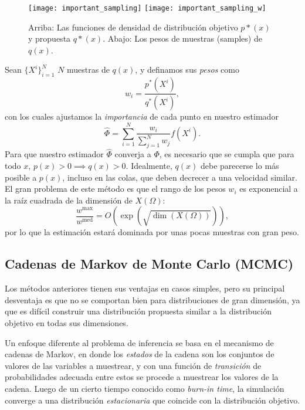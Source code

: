 \begin{figure}[h]
	\centering
	\texttt{[image: important\_sampling]}
	\texttt{[image: important\_sampling\_w]}
	\caption{Arriba: Las funciones de densidad de distribución objetivo \(p*(x)\) y propuesta \(q*(x)\). Abajo: Los pesos de muestras (samples) de \(q(x)\).}
	\label{fig:important_sampling}
\end{figure}

Sean \(\{X^i\}_{i=1}^N\) \(N\) muestras de \(q(x)\), y definamos sus \emph{pesos} como
\begin{equation*}
w_i = \frac{p^{\ast}(X^i)}{q^{\ast}(X^i)},
\end{equation*}
con los cuales ajustamos la \emph{importancia} de cada punto en nuestro estimador
\begin{equation*}
\hat{\Phi} = \sum_{i=1}^N \frac{w_i}{\sum_{j=1}^N w_j} f(X^i).
\end{equation*}
Para que nuestro estimador \(\hat{\Phi}\) converja a \(\Phi\), es necesario que se cumpla que para todo \(x\), \(p(x) > 0 \implies q(x) > 0\). Idealmente, \(q(x)\) debe parecerse lo más posible a \(p(x)\), incluso en las colas, que deben decrecer a una velocidad similar. El gran problema de este método es que el rango de los pesos \(w_i\) es exponencial a la raíz cuadrada de la dimensión de \(X(\Omega)\):
\begin{equation*}
\frac{w^{\max}}{w^{\mathrm{med}}} = O(\exp(\sqrt{\dim(X(\Omega))})),
\end{equation*}
por lo que la estimación estará dominada por unas pocas muestras con gran peso.

\subsection{Cadenas de Markov de Monte Carlo (MCMC)}

Los métodos anteriores tienen sus ventajas en casos simples, pero su principal desventaja es que no se comportan bien para distribuciones de gran dimensión, ya que es difícil construir una distribución propuesta similar a la distribución objetivo en todas sus dimensiones. 

Un enfoque diferente al problema de inferencia se basa en el mecanismo de cadenas de Markov, en donde los \emph{estados} de la cadena son los conjuntos de valores de las variables a muestrear, y con una función de \emph{transición} de probabilidades adecuada entre estos se procede a muestrear los valores de la cadena. Luego de un cierto tiempo conocido como \emph{burn-in time}, la simulación converge a una distribución \emph{estacionaria} que coincide con la distribución objetivo.

